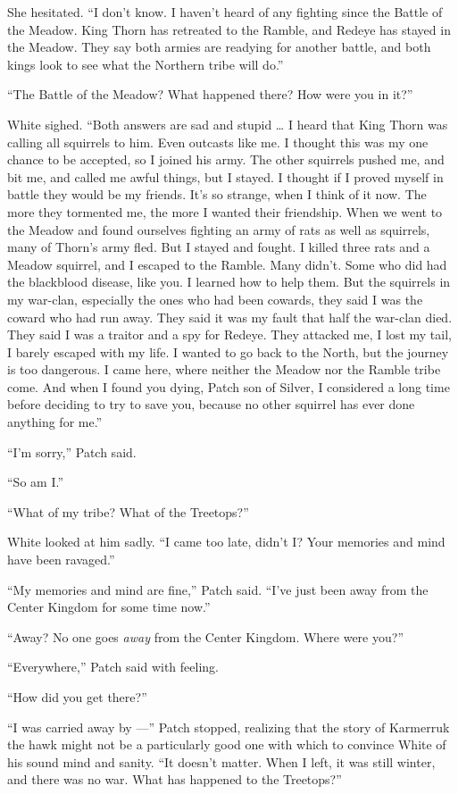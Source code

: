 \documentclass[ebook,oneside,openany,17pt]{memoir}
\begin{document}
She hesitated. “I don’t know. I haven’t heard of any fighting since
the Battle of the Meadow. King Thorn has retreated to the Ramble, and
Redeye has stayed in the Meadow. They say both armies are readying for
another battle, and both kings look to see what the Northern tribe
will do.”

“The Battle of the Meadow? What happened there? How were you in it?”

White sighed. “Both answers are sad and stupid … I heard that King
Thorn was calling all squirrels to him. Even outcasts like me. I
thought this was my one chance to be accepted, so I joined his
army. The other squirrels pushed me, and bit me, and called me awful
things, but I stayed. I thought if I proved myself in battle they
would be my friends. It’s so strange, when I think of it now. The more
they tormented me, the more I wanted their friendship. When we went to
the Meadow and found ourselves fighting an army of rats as well as
squirrels, many of Thorn’s army fled. But I stayed and fought. I
killed three rats and a Meadow squirrel, and I escaped to the
Ramble. Many didn’t. Some who did had the blackblood disease, like
you. I learned how to help them. But the squirrels in my war-clan,
especially the ones who had been cowards, they said I was the coward
who had run away. They said it was my fault that half the war-clan
died. They said I was a traitor and a spy for Redeye. They attacked
me, I lost my tail, I barely escaped with my life. I wanted to go back
to the North, but the journey is too dangerous. I came here, where
neither the Meadow nor the Ramble tribe come. And when I found you
dying, Patch son of Silver, I considered a long time before deciding
to try to save you, because no other squirrel has ever done anything
for me.”

“I’m sorry,” Patch said.

“So am I.”

“What of my tribe? What of the Treetops?”

White looked at him sadly. “I came too late, didn’t I? Your memories
and mind have been ravaged.”

“My memories and mind are fine,” Patch said. “I’ve just been away from
the Center Kingdom for some time now.”

“Away? No one goes \emph{away} from the Center Kingdom. Where were
you?”

“Everywhere,” Patch said with feeling.

“How did you get there?”

“I was carried away by —” Patch stopped, realizing that the story of
Karmerruk the hawk might not be a particularly good one with which to
convince White of his sound mind and sanity. “It doesn’t matter. When
I left, it was still winter, and there was no war. What has happened
to the Treetops?”
\end{document}

